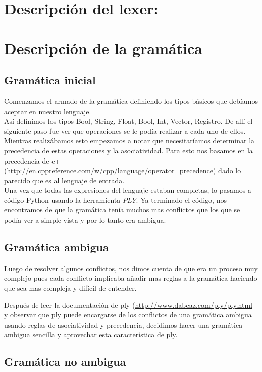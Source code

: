 \section{Descripción del lexer:}


\section{Descripción de la gramática}

\subsection{Gramática inicial}
Comenzamos el armado de la gramática definiendo los tipos básicos que debíamos aceptar en nuestro lenguaje.
\\
Así definimos los tipos Bool, String, Float, Bool, Int, Vector, Registro. De allí el siguiente paso fue ver que operaciones se le podía realizar a cada uno de ellos.
\\
Mientras realizábamos esto empezamos a notar que necesitaríamos determinar la precedencia de estas operaciones y la asociatividad. Para esto nos basamos en la precedencia de c++ (\url{http://en.cppreference.com/w/cpp/language/operator_precedence}) dado lo parecido que es al lenguaje de entrada.
\\

Una vez que todas las expresiones del lenguaje estaban completas, lo pasamos a código Python usando la herramienta $PLY$. Ya terminado el código, nos encontramos de que la gramática tenía muchos mas conflictos que los que se podía ver a simple vista y por lo tanto era ambigua. 

\subsection{Gramática ambigua}

Luego de resolver algunos conflictos, nos dimos cuenta de que era un proceso muy complejo pues cada conflicto implicaba añadir mas reglas a la gramática haciendo que sea mas compleja y difícil de entender.

Después de leer la documentación de ply (\url{http://www.dabeaz.com/ply/ply.html} y observar que ply puede encargarse de los conflictos de una gramática ambigua usando reglas de asociatividad y precedencia, decidimos hacer una gramática ambigua sencilla y aprovechar esta característica de ply.

\subsection{Gramática no ambigua}

